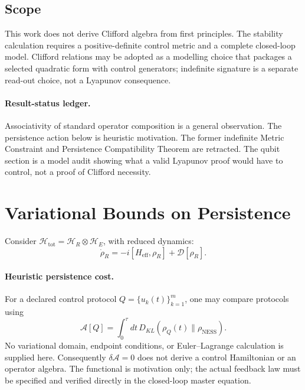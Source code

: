 \documentclass[12pt,a4paper,openany]{book}
\begin{document}
\subsection{Scope}

This work does not derive Clifford algebra from first principles.  The stability calculation requires a positive-definite control metric and a complete closed-loop model.  Clifford relations may be adopted as a modelling choice that packages a selected quadratic form with control generators; indefinite signature is a separate read-out choice, not a Lyapunov consequence.

\paragraph{Result-status ledger.}
Associativity of standard operator composition is a general observation.  The persistence action below is heuristic motivation.  The former indefinite Metric Constraint and Persistence Compatibility Theorem are retracted.  The qubit section is a model audit showing what a valid Lyapunov proof would have to control, not a proof of Clifford necessity.

\section{Variational Bounds on Persistence}
\label{Q-B-sec:variational}

Consider $\mathcal{H}_{\mathrm{tot}} = \mathcal{H}_R \otimes \mathcal{H}_E$, with reduced dynamics:
\begin{equation}
\dot{\rho}_R = -i[H_{\mathrm{eff}}, \rho_R] + \mathcal{D}[\rho_R].
\end{equation}

\paragraph{Heuristic persistence cost.}
For a declared control protocol $Q=\{u_k(t)\}_{k=1}^m$, one may compare protocols using
\begin{equation}
\mathcal{A}[Q] = \int_0^\tau dt\, D_{KL}(\rho_Q(t) \| \rho_{\mathrm{NESS}}).
\end{equation}
No variational domain, endpoint conditions, or Euler--Lagrange calculation is supplied here.  Consequently $\delta\mathcal A=0$ does not derive a control Hamiltonian or an operator algebra.  The functional is motivation only; the actual feedback law must be specified and verified directly in the closed-loop master equation.
\end{document}
